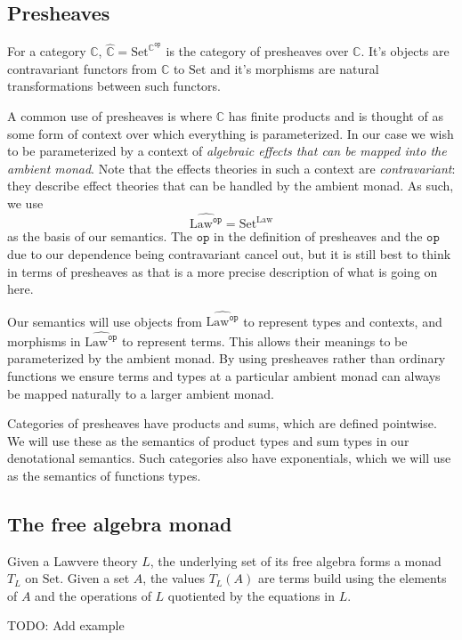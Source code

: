 \documentclass[acmsmall, screen, nonacm]{acmart}
\theoremstyle{definition}
\newcommand{\cat}{\mathbb{C}}
\newcommand{\op}{\mathtt{op}}
\newcommand{\catop}{\cat^{\op}}
\newcommand{\setc}{\mathrm{Set}}
\newcommand{\psh}{\widehat{\cat}}
\newcommand{\lawc}{\mathrm{Law}}
\newcommand{\lawcop}{\lawc^{\mathtt{op}}}
\newcommand{\pshlawcop}{\widehat{\lawcop}}
\newcommand{\todo}[1]{{\color{red}TODO: #1}}
\begin{document}
\subsection{Presheaves}

For a category $\cat$, $\psh = \setc^{\catop}$ is the category of
presheaves over $\cat$. It's objects are contravariant functors from
$\cat$ to $\setc$ and it's morphisms are natural transformations between
such functors.

A common use of presheaves is where $\cat$ has finite products and is
thought of as some form of context over which everything is
parameterized. In our case we wish to be parameterized by a context of
\emph{algebraic effects that can be mapped into the ambient monad}. Note
that the effects theories in such a context are \emph{contravariant}:
they describe effect theories that can be handled by the ambient
monad. As such, we use
\begin{equation*}
  \pshlawcop = \setc^{\lawc}
\end{equation*}
as the basis of our semantics. The $\op$ in the definition of presheaves
and the $\op$ due to our dependence being contravariant cancel out, but
it is still best to think in terms of presheaves as that is a more
precise description of what is going on here.

Our semantics will use objects from $\pshlawcop$ to represent types and
contexts, and morphisms in $\pshlawcop$ to represent terms. This allows
their meanings to be parameterized by the ambient monad. By using
presheaves rather than ordinary functions we ensure terms and types at a
particular ambient monad can always be mapped naturally to a larger
ambient monad.

Categories of presheaves have products and sums, which are defined
pointwise. We will use these as the semantics of product types and sum
types in our denotational semantics. Such categories also have
exponentials, which we will use as the semantics of functions types.

\subsection{The free algebra monad}

Given a Lawvere theory $L$, the underlying set of its free algebra forms
a monad $T_L$ on $\setc$. Given a set $A$, the values $T_L(A)$ are terms
build using the elements of $A$ and the operations of $L$ quotiented by
the equations in $L$.

\todo{Add example}
\end{document}
